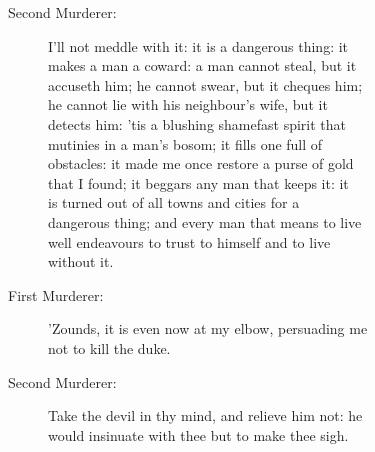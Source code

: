 \documentclass{article}
\begin{document}
\begin{description}
\item[Second Murderer:] 
\hspace{1pt}I'll not meddle with it: it is a dangerous thing: it\\
\hspace{1pt}makes a man a coward: a man cannot steal, but it\\
\hspace{1pt}accuseth him; he cannot swear, but it cheques him;\\
\hspace{1pt}he cannot lie with his neighbour's wife, but it\\
\hspace{1pt}detects him: 'tis a blushing shamefast spirit that\\
\hspace{1pt}mutinies in a man's bosom; it fills one full of\\
\hspace{1pt}obstacles: it made me once restore a purse of gold\\
\hspace{1pt}that I found; it beggars any man that keeps it: it\\
\hspace{1pt}is turned out of all towns and cities for a\\
\hspace{1pt}dangerous thing; and every man that means to live\\
\hspace{1pt}well endeavours to trust to himself and to live\\
\hspace{1pt}without it.\\
\end{description}
\begin{description}
\item[First Murderer:] 
\hspace{1pt}'Zounds, it is even now at my elbow, persuading me\\
\hspace{1pt}not to kill the duke.\\
\end{description}
\begin{description}
\item[Second Murderer:] 
\hspace{1pt}Take the devil in thy mind, and relieve him not: he\\
\hspace{1pt}would insinuate with thee but to make thee sigh.\\
\end{description}
\end{document}
